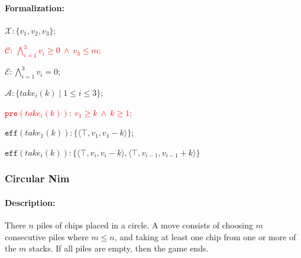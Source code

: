 \documentclass[review]{elsarticle}
\newcommand{\set}[1]{\{ #1 \}}
\newcommand{\tuple}[1]{\langle {#1} \rangle}
\newcommand{\true}{\top}
\newcommand{\statevar}{\mathcal{X}}
\newcommand{\act}{\mathcal{A}}
\newcommand{\constraint}{\mathcal{C}}
\newcommand{\estate}{\mathcal{E}}
\newcommand{\pre}{\mathtt{pre}}
\newcommand{\eff}{\mathtt{eff}}
\begin{document}
\paragraph{Formalization:}
\begin{itemize}
	\item $\statevar: \set{v_1, v_2, v_3}$;
	\textcolor{red}{\item $\constraint:\ \bigwedge_{i=1}^{3} v_i \ge 0\ \wedge\ v_3 \le m$;}
	\item $\estate: \bigwedge_{i=1}^{3} v_i = 0$;
	\item $\act:\set{take_i(k){\mid}1 \le i \le 3} $;
	\textcolor{red}{\item $\pre(take_i(k)):\ v_1 \ge k \ \wedge\ k \ge 1$;}
	\item $\eff(take_1(k)) : \set{\tuple{\true,v_1,v_1 -k}}$;
	\item $\eff(take_i(k)) : \set{\tuple{\true,v_i,v_i -k}, \tuple{\true,v_{i-1},v_{i-1} + k}}$
\end{itemize}

\subsubsection{Circular Nim \protect\cite{DufH2013}}

\paragraph{Description:}  
There $n$ piles of chips placed in a circle. 
A move consists of choosing $m$ consecutive piles where $m \leq n$, and taking at least one chip from one or more of the $m$ stacks. 
If all piles are empty, then the game ends. 
%		
\end{document}
